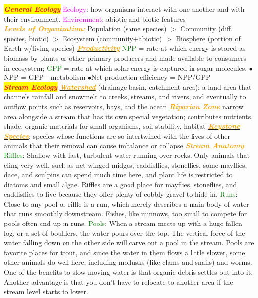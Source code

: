 \documentclass{article}
\author{SBHS Science Olympiad, Tarang}
\newcommand{\ddd}{$\bullet$}
\newcommand{\red}[1]{\textcolor{red}{#1}}
\newcommand{\green}[1]{\textcolor{green}{#1}}
\newcommand{\pink}[1]{\textcolor{magenta}{#1}}
\newcommand{\orange}[1]{\textcolor{orange}{#1}}
\newcommand{\mysection}[1]{\colorbox{yellow}{\textbf{\textit{\red{#1}}}}}
\newcommand{\mysubsection}[1]{\underline{\textbf{{\textit{\orange{#1}}}}}}
\newcommand{\mysubsub}[1]{{{\green{#1}}}}
\begin{document}
\tiny
\begin{multicols*}{4}
	
    \mysection{General Ecology} 
        \pink{Ecology}: how organisms interact with one another and with their environment. 
        \pink{Environment}: abiotic and biotic features\\
        \mysubsection{\textit{Levels of Organization:}} Population (same species) $>$  Community (diff. species, biotic) $>$ Ecosystem (community+abiotic) $>$ Biosphere (portion of Earth w/living species)
        \mysubsection{Productivity}
        \green{NPP} = rate at which energy is stored as biomass by plants or other primary producers and made available to consumers in ecosystem; \green{GPP} = rate at which solar energy is captured in sugar molecules.
        \ddd NPP = GPP - metabolism \ddd Net production efficiency = NPP/GPP
    \\
    \mysection{Stream Ecology}
        \mysubsection{Watershed} (drainage basin, catchment area): a land area that channels rainfall and snowmelt to creeks, streams, and rivers, and eventually to outflow points such as reservoirs, bays, and the ocean
        \mysubsection{Riparian Zone} narrow area alongside a stream that has its own special vegetation; contributes nutrients, shade, organic materials for small organisms, soil stability, habitat
        \mysubsection{Keystone Species}:  species whose functions are so intertwined with the lives of other animals that their removal can cause imbalance or collapse
        \mysubsection{Stream Anatomy} 
        	\mysubsub{Riffles}: Shallow with fast, turbulent water running over rocks. Only animals that cling very well, such as net-winged midges, caddisflies, stoneflies, some mayflies, dace, and sculpins can spend much time here, and plant life is restricted to diatoms and small algae. Riffles are a good place for mayflies, stoneflies, and caddisflies to live because they offer plenty of cobbly gravel to hide in.
        	\mysubsub{Runs}: Close to any pool or riffle is a run, which merely describes a main body of water that runs smoothly downstream. Fishes, like minnows, too small to compete for pools often end up in runs.
        	\mysubsub{Pools}: When a stream meets up with a huge fallen log, or a set of boulders, the water pours over the top. The vertical force of the water falling down on the other side will carve out a pool in the stream. Pools are favorite places for trout, and since the water in them flows a little slower, some other animals do well here, including mollusks (like clams and snails) and worms. One of the benefits to slow-moving water is that organic debris settles out into it. Another advantage is that you don't have to relocate to another area if the stream level starts to lower.

\end{multicols*}
\end{document}
